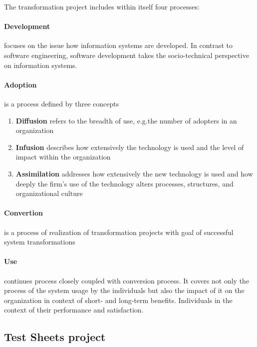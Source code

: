 The transformation project includes within itself four processes:
\paragraph{Development} focuses on the issue how information systems are developed. In contrast to software engineering, software development takes the socio-technical perspective on information systems\cite{MES6}.

\paragraph{Adoption} is a process defined by three concepts\cite{MES7}
\begin{enumerate}
	\item \textbf{Diffusion} refers to the breadth of use, e.g.the number of adopters in an organization
	\item \textbf{Infusion} describes how extensively the technology is used and the level of impact within the organization
	\item \textbf{Assimilation} addresses how extensively the new technology is used and how deeply the firm's use of the technology alters processes, structures, and organizational culture
\end{enumerate}

\paragraph{Convertion} is a process of realization of transformation projects with goal of successful system transformations \cite{MES9}

\paragraph{Use} continues process closely coupled with conversion process. It covers not only the process of the system usage by the individuals but also the impact of it on the organization in context of short- and long-term benefits. Individuals in the context of their performance and satisfaction.

\subsection{Test Sheets project}




